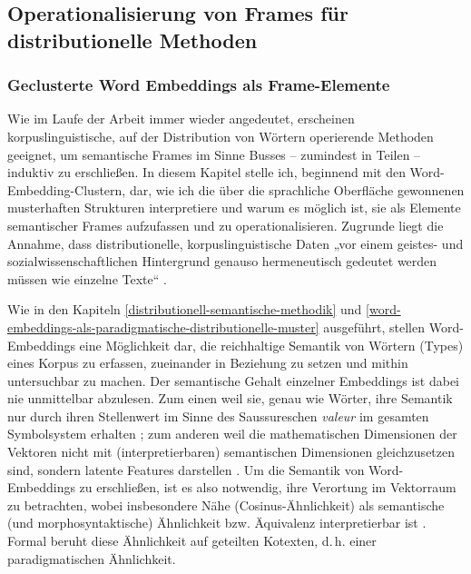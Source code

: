 \subsection{Operationalisierung von Frames für distributionelle Methoden}\label{operationalisierung-von-frames-fuer-distributionelle-methoden}

\subsubsection{Geclusterte Word Embeddings als Frame-Elemente}\label{geclusterte-word-embeddings-als-frame-elemente}

Wie im Laufe der Arbeit immer wieder angedeutet, erscheinen korpuslinguistische, auf der Distribution von Wörtern operierende Methoden geeignet, um semantische Frames im Sinne Busses \autocite*{busseFrameSemantikKompendium2012} -- zumindest in Teilen -- induktiv zu erschließen. In diesem Kapitel stelle ich, beginnend mit den Word-Embedding-Clustern, dar, wie ich die über die sprachliche Oberfläche gewonnenen musterhaften Strukturen interpretiere und warum es möglich ist, sie als Elemente semantischer Frames aufzufassen und zu operationalisieren. Zugrunde liegt die Annahme, dass distributionelle, korpuslinguistische Daten „vor einem geistes- und sozialwissenschaftlichen Hintergrund genauso hermeneutisch gedeutet werden müssen wie einzelne Texte`` \autocite[25, siehe ausführlicher ]{bubenhoferWennLinguistikKorpuslinguistik2018}.

Wie in den Kapiteln \ref{distributionell-semantische-methodik} und \ref{word-embeddings-als-paradigmatische-distributionelle-muster} ausgeführt, stellen Word-Embeddings eine Möglichkeit dar, die reichhaltige Semantik von Wörtern (Types) eines Korpus zu erfassen, zueinander in Beziehung zu setzen und mithin untersuchbar zu machen. Der semantische Gehalt einzelner Embeddings ist dabei nie unmittelbar abzulesen. Zum einen weil sie, genau wie Wörter, ihre Semantik nur durch ihren Stellenwert im Sinne des Saussureschen \emph{valeur} im gesamten Symbolsystem erhalten \autocite{sahlgrenDistributionalHypothesis2008}; zum anderen weil die mathematischen Dimensionen der Vektoren nicht mit (interpretierbaren) semantischen Dimensionen gleichzusetzen sind, sondern latente Features darstellen \autocite[156-157]{lenciDistributionalModelsWord2018}. Um die Semantik von Word-Embeddings zu erschließen, ist es also notwendig, ihre Verortung im Vektorraum zu betrachten, wobei insbesondere Nähe (Cosinus-Ähnlichkeit) als semantische (und morphosyntaktische) Ähnlichkeit bzw. Äquivalenz interpretierbar ist \autocite{bubenhoferSemantischeAquivalenzGeburtserzahlungen2020, belicaSemantischeNaheAls2011}. Formal beruht diese Ähnlichkeit auf geteilten Kotexten, d.\,h. einer paradigmatischen Ähnlichkeit.

